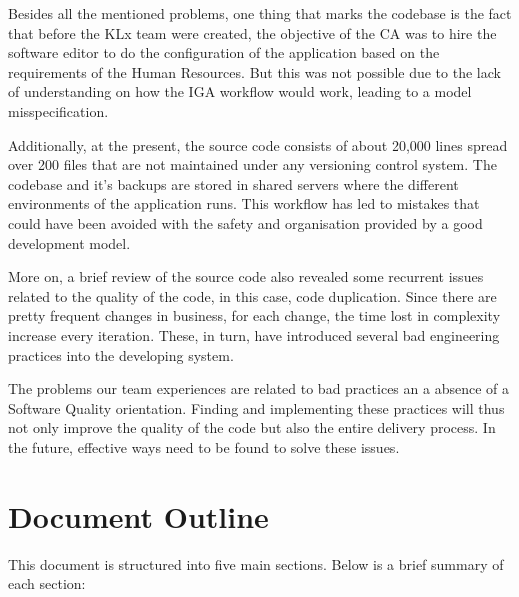 Besides all the mentioned problems, one thing that marks the codebase is the fact that before the KLx team were created, the objective of the CA was to hire the software editor to do the configuration of the application based on the requirements of the Human Resources. But this was not possible due to the lack of understanding on how the IGA workflow would work, leading to a model misspecification. 

Additionally, at the present, the source code consists of about 20,000 lines spread over 200 files that are not maintained under any versioning control system. The codebase and it's backups are stored in shared servers where the different environments of the application runs. This workflow has led to mistakes that could have been avoided with the safety and organisation provided by a good development model.

More on, a brief review of the source code also revealed some recurrent issues related to the quality of the code, in this case, code duplication. Since there are pretty frequent changes in business, for each change, the time lost in complexity increase every iteration. These, in turn, have introduced several bad engineering practices into the developing system.

The problems our team experiences are related to bad practices an a absence of a Software Quality orientation. Finding and implementing these practices will thus not only improve the quality of the code but also the entire delivery process. In the future, effective ways need to be found to solve these issues.

\section{Document Outline}

This document is structured into five main sections. Below is a brief summary of each section:

